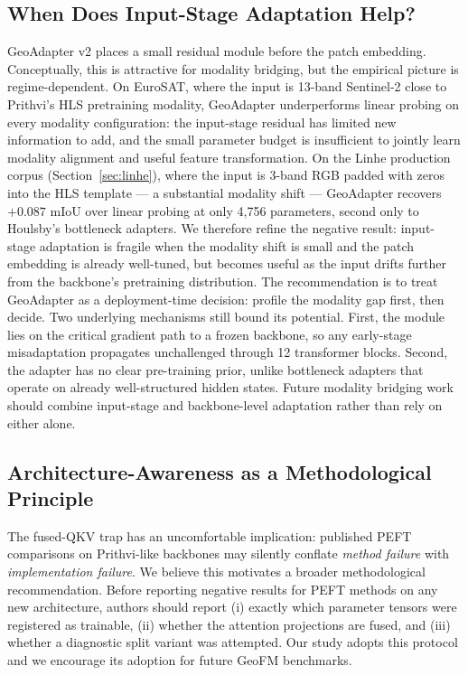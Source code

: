 \documentclass[11pt]{article}
\begin{document}
\subsection{When Does Input-Stage Adaptation Help?}
GeoAdapter v2 places a small residual module before the patch embedding. Conceptually, this is attractive for modality bridging, but the empirical picture is regime-dependent. On EuroSAT, where the input is 13-band Sentinel-2 close to Prithvi's HLS pretraining modality, GeoAdapter underperforms linear probing on every modality configuration: the input-stage residual has limited new information to add, and the small parameter budget is insufficient to jointly learn modality alignment and useful feature transformation. On the Linhe production corpus (Section~\ref{sec:linhe}), where the input is 3-band RGB padded with zeros into the HLS template --- a substantial modality shift --- GeoAdapter recovers $+0.087$ mIoU over linear probing at only 4{,}756 parameters, second only to Houlsby's bottleneck adapters. We therefore refine the negative result: input-stage adaptation is fragile when the modality shift is small and the patch embedding is already well-tuned, but becomes useful as the input drifts further from the backbone's pretraining distribution. The recommendation is to treat GeoAdapter as a deployment-time decision: profile the modality gap first, then decide. Two underlying mechanisms still bound its potential. First, the module lies on the critical gradient path to a frozen backbone, so any early-stage misadaptation propagates unchallenged through 12 transformer blocks. Second, the adapter has no clear pre-training prior, unlike bottleneck adapters that operate on already well-structured hidden states. Future modality bridging work should combine input-stage and backbone-level adaptation rather than rely on either alone.

\subsection{Architecture-Awareness as a Methodological Principle}
The fused-QKV trap has an uncomfortable implication: published PEFT comparisons on Prithvi-like backbones may silently conflate \emph{method failure} with \emph{implementation failure}. We believe this motivates a broader methodological recommendation. Before reporting negative results for PEFT methods on any new architecture, authors should report (i) exactly which parameter tensors were registered as trainable, (ii) whether the attention projections are fused, and (iii) whether a diagnostic split variant was attempted. Our study adopts this protocol and we encourage its adoption for future GeoFM benchmarks.
\end{document}

